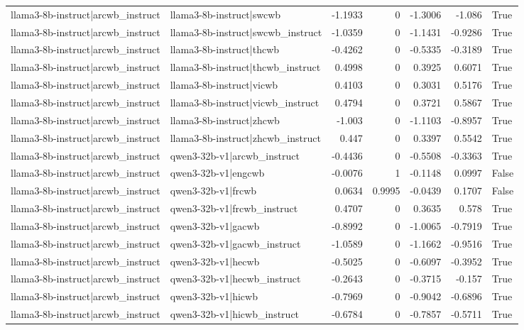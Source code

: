 \begin{table}
\begin{tabular}{l l r r r r l}
llama3-8b-instruct|arcwb_instruct & llama3-8b-instruct|swcwb & -1.1933 & 0 & -1.3006 & -1.086 & True \\
llama3-8b-instruct|arcwb_instruct & llama3-8b-instruct|swcwb_instruct & -1.0359 & 0 & -1.1431 & -0.9286 & True \\
llama3-8b-instruct|arcwb_instruct & llama3-8b-instruct|thcwb & -0.4262 & 0 & -0.5335 & -0.3189 & True \\
llama3-8b-instruct|arcwb_instruct & llama3-8b-instruct|thcwb_instruct & 0.4998 & 0 & 0.3925 & 0.6071 & True \\
llama3-8b-instruct|arcwb_instruct & llama3-8b-instruct|vicwb & 0.4103 & 0 & 0.3031 & 0.5176 & True \\
llama3-8b-instruct|arcwb_instruct & llama3-8b-instruct|vicwb_instruct & 0.4794 & 0 & 0.3721 & 0.5867 & True \\
llama3-8b-instruct|arcwb_instruct & llama3-8b-instruct|zhcwb & -1.003 & 0 & -1.1103 & -0.8957 & True \\
llama3-8b-instruct|arcwb_instruct & llama3-8b-instruct|zhcwb_instruct & 0.447 & 0 & 0.3397 & 0.5542 & True \\
llama3-8b-instruct|arcwb_instruct & qwen3-32b-v1|arcwb_instruct & -0.4436 & 0 & -0.5508 & -0.3363 & True \\
llama3-8b-instruct|arcwb_instruct & qwen3-32b-v1|engcwb & -0.0076 & 1 & -0.1148 & 0.0997 & False \\
llama3-8b-instruct|arcwb_instruct & qwen3-32b-v1|frcwb & 0.0634 & 0.9995 & -0.0439 & 0.1707 & False \\
llama3-8b-instruct|arcwb_instruct & qwen3-32b-v1|frcwb_instruct & 0.4707 & 0 & 0.3635 & 0.578 & True \\
llama3-8b-instruct|arcwb_instruct & qwen3-32b-v1|gacwb & -0.8992 & 0 & -1.0065 & -0.7919 & True \\
llama3-8b-instruct|arcwb_instruct & qwen3-32b-v1|gacwb_instruct & -1.0589 & 0 & -1.1662 & -0.9516 & True \\
llama3-8b-instruct|arcwb_instruct & qwen3-32b-v1|hecwb & -0.5025 & 0 & -0.6097 & -0.3952 & True \\
llama3-8b-instruct|arcwb_instruct & qwen3-32b-v1|hecwb_instruct & -0.2643 & 0 & -0.3715 & -0.157 & True \\
llama3-8b-instruct|arcwb_instruct & qwen3-32b-v1|hicwb & -0.7969 & 0 & -0.9042 & -0.6896 & True \\
llama3-8b-instruct|arcwb_instruct & qwen3-32b-v1|hicwb_instruct & -0.6784 & 0 & -0.7857 & -0.5711 & True \\

\end{tabular}
\end{table}

